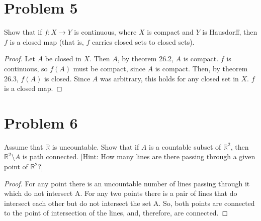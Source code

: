 \documentclass[11pt]{article}
\begin{document}
\section{Problem 5}
\label{sec:orgb3f60db}

Show that if \(f: X\rightarrow Y\) is continuous, where \(X\) is compact and \(Y\) is
Hausdorff, then \(f\) is a closed map (that is, \(f\) carries closed sets to closed
sets). 


\begin{proof}
Let \(A\) be closed in \(X\). Then \(A\), by theorem 26.2, \(A\) is compact. \(f\) is
continuous, so \(f(A)\) must be compact, since \(A\) is compact. Then, by theorem
26.3, \(f(A)\) is closed. Since \(A\) was arbitrary, this holds for any closed set
in \(X\). \(f\) is a closed map.
\end{proof}
\section{Problem 6}
\label{sec:orge072810}

Assume that \(\mathbb{R}\) is uncountable. Show that if \(A\) is a countable subset
of \(\mathbb{R}^2\), then \(\mathbb{R}^2 \setminus A\) is path connected. [Hint: How
many lines are there passing through a given point of \(\mathbb{R}^2\)?]


\begin{proof}
For any point there is an uncountable number of lines passing through it which
do not intersect A. For any two points there is a pair of lines that do
intersect each other but do not intersect the set A. So, both points are
connected to the point of intersection of the lines, and, therefore, are
connected.
\end{proof}
\end{document}
